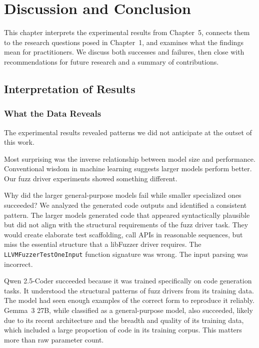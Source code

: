 
\chapter{Discussion and Conclusion}
\label{chap:discussion}

This chapter interprets the experimental results from Chapter~5, connects them to the research questions posed in Chapter~1, and examines what the findings mean for practitioners. We discuss both successes and failures, then close with recommendations for future research and a summary of contributions.


\section{Interpretation of Results}
\label{sec:discussion_interpretation}

\subsection{What the Data Reveals}
\label{sec:discussion_data}

The experimental results revealed patterns we did not anticipate at the outset of this work.

Most surprising was the inverse relationship between model size and performance. Conventional wisdom in machine learning suggests larger models perform better. Our fuzz driver experiments showed something different.

Why did the larger general-purpose models fail while smaller specialized ones succeeded? We analyzed the generated code outputs and identified a consistent pattern. The larger models generated code that appeared syntactically plausible but did not align with the structural requirements of the fuzz driver task. They would create elaborate test scaffolding, call APIs in reasonable sequences, but miss the essential structure that a libFuzzer driver requires. The \texttt{LLVMFuzzerTestOneInput} function signature was wrong. The input parsing was incorrect.

Qwen 2.5-Coder succeeded because it was trained specifically on code generation tasks. It understood the structural patterns of fuzz drivers from its training data. The model had seen enough examples of the correct form to reproduce it reliably. Gemma~3 27B, while classified as a general-purpose model, also succeeded, likely due to its recent architecture and the breadth and quality of its training data, which included a large proportion of code in its training corpus. This matters more than raw parameter count.

